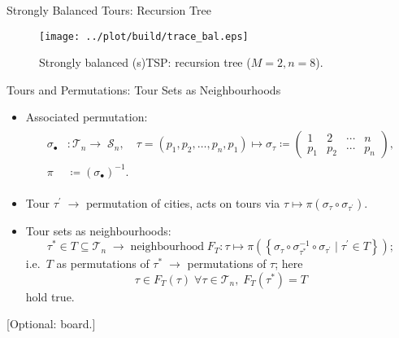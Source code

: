 \documentclass[
  size=8pt,
  style=klope,
  paper=screen,
  pauseslide,
  nopagebreaks,
  hlsections,
  fleqn
]{powerdot}
\def\board{{\color{green} [Optional: board.]}}
\def\eqitspace{\vspace{-5mm}}
\begin{document}
\begin{slide}[toc=]{Strongly Balanced Tours: Recursion Tree}
  \begin{figure}[H]
    \centering
    \texttt{[image: ../plot/build/trace\_bal.eps]}
    \caption{Strongly balanced (s)TSP: recursion tree ($M=2,n=8$).}
  \end{figure}
\end{slide}

\begin{slide}{Tours and Permutations: Tour Sets as Neighbourhoods}
  \begin{itemize}
  \item
  Associated permutation:
  \begin{align}
  \begin{split}
    \sigma_\bullet & :
    \mathcal{T}_n \to \; \mathcal{S}_n, \quad
    \tau = \left(p_1, p_2, \ldots, p_n, p_1 \right)
    \mapsto
  \sigma_\tau \coloneqq
  \begin{pmatrix}
    1 & 2 & \cdots & n \\
    p_1 & p_2 & \cdots &  p_n
  \end{pmatrix},
  \\
  \pi & \coloneqq \left(\sigma_{\bullet}\right)^{-1}.
  \end{split}
  \end{align}
  \eqitspace%
  \item
  Tour $\tau^\prime \; \rightarrow$ permutation of cities, acts on tours via $\tau \mapsto \pi\left(\sigma_\tau \circ \sigma_{\tau^\prime}\right)$.
  \item
    Tour sets as neighbourhoods:
    \begin{equation}
      \tau^\ast \in T \subseteq \mathcal{T}_n
      \; \rightarrow \;
      \text{neighbourhood} \;
      F_T : \tau \mapsto
      \pi \left(
        \left\{ \sigma_{\tau} \circ \sigma_{\tau^\ast}^{-1} \circ \sigma_{\tau^\prime} \mid \tau^{\prime} \in T\right\}
      \right);
    \end{equation}
    i.e.\ $T$ as permutations of $\tau^\ast \; \rightarrow $ permutations of $\tau$;
    here
    \begin{equation*}
      \tau \in F_T\left(\tau\right) \; \forall \tau \in \mathcal{T}_n, \; F_T\left(\tau^\ast\right) = T
    \end{equation*} hold true.
  \end{itemize}
  \board
\end{slide}
\end{document}
